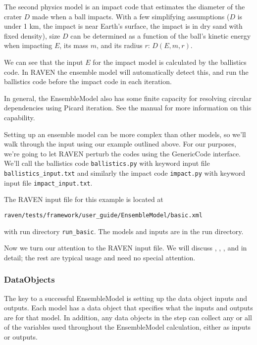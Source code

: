 The second physics model is an impact code that estimates the diameter of the crater $D$ made when a ball
impacts.  With a few simplifying assumptions ($D$ is under 1 km, the impact is near Earth's surface, the
impact is in dry sand with fixed density), size $D$ can be determined as a function of the ball's kinetic
energy when impacting $E$, its mass $m$, and its radius $r$: $D(E,m,r)$.

We can see that the input $E$ for the impact model is calculated by the ballistics code.  In RAVEN the
ensemble model will automatically detect this, and run the ballistics code before the impact code in each
iteration.

In general, the EnsembleModel also has some finite capacity for resolving circular dependencies using Picard
iteration.  See the manual for more information on this capability.

Setting up an ensemble model can be more complex than other models, so we'll walk through the input using our example
outlined above.  For
our purposes, we're going to let RAVEN perturb the codes using the GenericCode interface.  We'll call the
ballistics code \texttt{ballistics.py} with keyword input file \texttt{ballistics\_input.txt} and similarly the impact
code \texttt{impact.py} with keyword input file \texttt{impact\_input.txt}.

The RAVEN input file for this example is located at
\begin{verbatim}
raven/tests/framework/user_guide/EnsembleModel/basic.xml
\end{verbatim}
with run directory \texttt{run\_basic}.  The models and inputs are in the run directory.

Now we turn our attention to the RAVEN input file. We will discuss , ,
, and  in detail; the rest are typical usage and need no special attention.

\subsubsection{DataObjects}
The key to a successful EnsembleModel is setting up the data object inputs and outputs.  Each model has a
 data object that specifies what the inputs and outputs are for that model.  In
addition, any  data objects in the  step can collect any or all of the
variables used throughout the EnsembleModel calculation, either as inputs or outputs.

